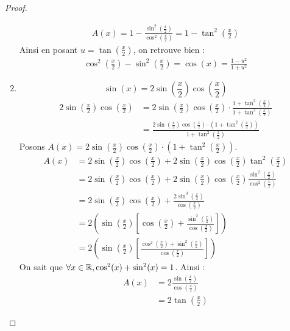 \begin{proof}
\begin{enumerate}
             \begin{align*}
                 A(x) = 1 - \frac{\sin^2\left( \frac{x}{2} \right)}{\cos^2\left( \frac{x}{2} \right)} = 1 - \tan^2 \left( \frac{x}{2} \right)
             \end{align*}
             Ainsi en posant $u = \tan(\frac{x}{2})$, on retrouve bien :
             \begin{align*}
                 \cos^2\left( \frac{x}{2} \right) - \sin^2\left( \frac{x}{2} \right) = \cos(x) = \frac{1 - u^2}{1 + u^2}
             \end{align*}
     \item \[ \sin(x) =  2 \sin(\frac{x}{2}) \cos(\frac{x}{2}) \]
        \begin{align*}
            2\sin(\frac{x}{2})\cos(\frac{x}{2}) &= 2\sin(\frac{x}{2})\cos(\frac{x}{2}) \cdot \frac{1 + \tan^2 \left( \frac{x}{2} \right)}{1 + \tan^2 \left( \frac{x}{2} \right)} \\
            &= \frac{2\sin(\frac{x}{2})\cos(\frac{x}{2}) \cdot \left( 1 + \tan^2 \left( \frac{x}{2} \right) \right)}{1 + \tan^2 \left( \frac{x}{2} \right)}
        \end{align*}
        Posons $A(x) = 2\sin(\frac{x}{2})\cos(\frac{x}{2}) \cdot \left( 1 + \tan^2 \left( \frac{x}{2} \right) \right)$.
        \begin{align*}
            A(x) &= 2\sin(\frac{x}{2})\cos(\frac{x}{2}) + 2\sin(\frac{x}{2})\cos(\frac{x}{2}) \tan^2 \left( \frac{x}{2} \right) \\
            &= 2\sin(\frac{x}{2})\cos(\frac{x}{2}) + 2\sin(\frac{x}{2})\cos(\frac{x}{2}) \frac{\sin^2 \left( \frac{x}{2} \right)}{\cos^2 \left( \frac{x}{2} \right)} \\
            &= 2\sin(\frac{x}{2})\cos(\frac{x}{2}) + \frac{2 \sin^3 \left( \frac{x}{2} \right)}{\cos(\frac{x}{2})} \\ 
            &= 2 \left( \sin(\frac{x}{2}) \left[ \cos(\frac{x}{2}) + \frac{\sin^2 \left( \frac{x}{2} \right)}{\cos(\frac{x}{2})} \right] \right) \\
            &= 2 \left( \sin(\frac{x}{2}) \left[ \frac{\cos^2 \left(\frac{x}{2}\right) + \sin^2 \left( \frac{x}{2} \right)}{\cos(\frac{x}{2})} \right] \right)
        \end{align*}
        On sait que $\forall x \in \mathbb{R}, \cos^2(x) + \sin^2(x) = 1$. Ainsi :
        \begin{align*}
            A(x) &= 2 \frac{\sin(\frac{x}{2})}{\cos(\frac{x}{2})} \\
            &= 2 \tan(\frac{x}{2})

\end{align*}
\end{enumerate}
\end{proof}
